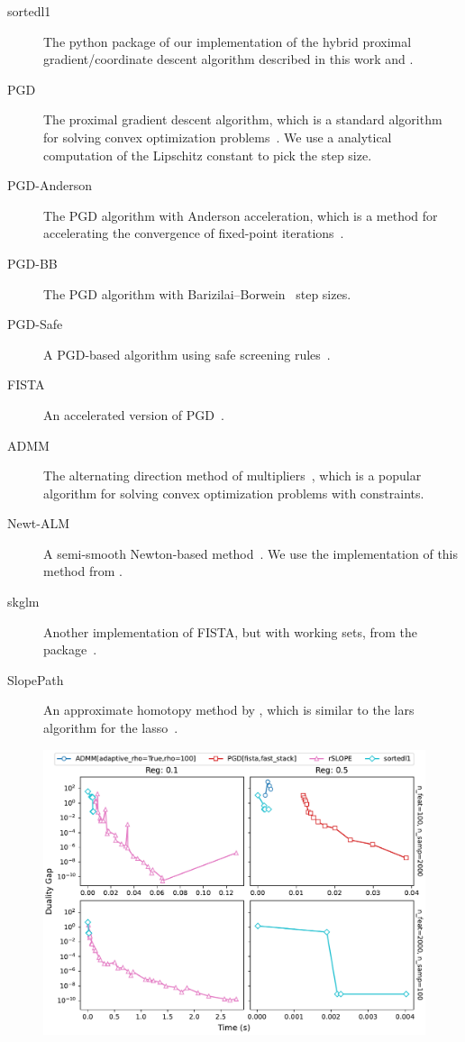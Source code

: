 \documentclass[article]{jss}
\makeatletter
\let\natwidth\Gin@nat@width
\makeatother
\begin{document}
\begin{description}
  \item[sortedl1] The python package of our implementation of the hybrid
        proximal gradient/coordinate descent algorithm described in this work and
        \citet{larsson2023}.
  \item[PGD] The proximal gradient descent algorithm, which is a standard
        algorithm for solving convex optimization problems~\citep{wright2009}. We use a
        analytical computation of the Lipschitz constant to pick the step size.
  \item[PGD-Anderson] The PGD algorithm with Anderson acceleration, which is a
        method for accelerating the convergence of fixed-point
        iterations~\citep{anderson1965,zhang2020}.
  \item[PGD-BB] The PGD algorithm with Barizilai--Borwein~\citep{barzilai1988} step sizes.
  \item[PGD-Safe] A PGD-based algorithm using safe screening rules~\citep{elvira2023}.
  \item[FISTA] An accelerated version of PGD~\citep{beck2009}.
  \item[ADMM] The alternating direction method of
        multipliers~\citep{glowinski1975,boyd2010}, which is a popular algorithm
        for solving convex optimization problems with constraints.
  \item[Newt-ALM] A semi-smooth Newton-based method~\citep{luo2019}. We use the
        implementation of this method from \citet{larsson2023}.
  \item[skglm] Another implementation of FISTA, but with working sets, from the
         package~\citep{bertrand2022}.
  \item[SlopePath] An approximate homotopy method by \citet{dupuis2024},
        which is similar to the lars algorithm for the lasso~\citep{efron2004}.
\end{description}

\begin{figure}[htpb]
  \centering
  \includegraphics[width=\natwidth]{images/benchmark_single_simulated.pdf}
  \caption{%
  }
\end{figure}
\end{document}
